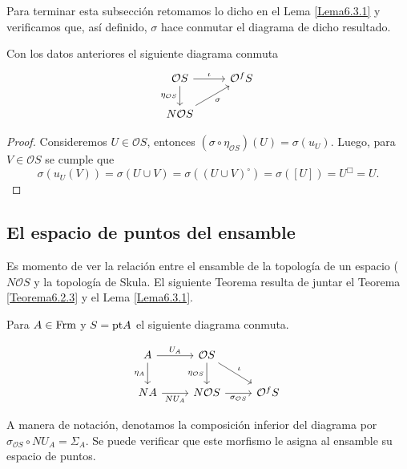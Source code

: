 Para terminar esta subsección retomamos lo dicho en el Lema \ref{Lema6.3.1} y verificamos que, así definido, $\sigma$ hace conmutar el diagrama de dicho resultado.

\begin{lem}\label{Lema6.3.6}
    Con los datos anteriores el siguiente diagrama conmuta
    \[\begin{tikzcd}
	{\mathcal{O}S} & {\mathcal{O} ^fS} \\
	{N\mathcal{O}S}
	\arrow["\iota", from=1-1, to=1-2]
	\arrow["{\eta_{\mathcal{O}S}}"', from=1-1, to=2-1]
	\arrow["\sigma"', from=2-1, to=1-2]
\end{tikzcd}\]
\end{lem}

\begin{proof}
    Consideremos $U\in \mathcal{O}S$, entonces $(\sigma\circ \eta_{\mathcal{O}S})(U)=\sigma(u_U)$. Luego, para $V\in \mathcal{O}S$ se cumple que 
    \[
    \sigma(u_U(V))=\sigma(U\cup V)=\sigma((U\cup V)^\circ)=\sigma([U])=U^\Box=U.
    \]
\end{proof}

\subsection{El espacio de puntos del ensamble}

Es momento de ver la relación entre el ensamble de la topología de un espacio ($N\mathcal{O}S$ y la topología de Skula. El siguiente Teorema resulta de juntar el Teorema \ref{Teorema6.2.3} y el Lema \ref{Lema6.3.1}.

\begin{thm}\label{Teorema6.4.1}
    Para $A\in \mathrm{Frm}$ y $S=\mathrm{pt} A$ el siguiente diagrama conmuta.

    \[\begin{tikzcd}
	A & {\mathcal{O}S} \\
	NA & {N\mathcal{O}S} & {\mathcal{O}^fS}
	\arrow["{U_A}", from=1-1, to=1-2]
	\arrow["{\eta_A}"', from=1-1, to=2-1]
	\arrow["{\eta_{\mathcal{O}S}}"', from=1-2, to=2-2]
	\arrow["\iota", from=1-2, to=2-3]
	\arrow["{NU_A}"', from=2-1, to=2-2]
	\arrow["{\sigma_{\mathcal{O}S}}"', from=2-2, to=2-3]
\end{tikzcd}\]
\end{thm}

A manera de notación, denotamos la composición inferior del diagrama por $\sigma_{\mathcal{O}S}\circ NU_A=\Sigma_A$. Se puede verificar que este morfismo le asigna al ensamble su espacio de puntos.

